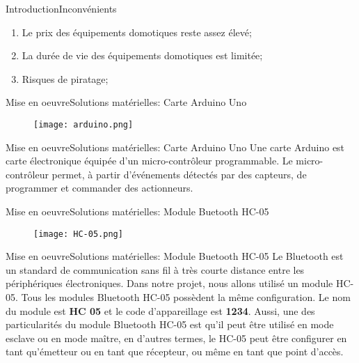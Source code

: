 \documentclass{beamer}
\begin{document}
	\begin{frame}{Introduction}{Inconvénients}
		\begin{enumerate}
			\item Le prix des équipements domotiques reste assez élevé;
			\item La durée de vie des équipements domotiques est limitée;
			\item Risques de piratage;
		\end{enumerate}
		
	\end{frame}
	
	\begin{frame}{Mise en oeuvre}{Solutions matérielles: Carte Arduino Uno}
		\begin{figure}\centering
			\texttt{[image: arduino.png]}
		\end{figure}	
	\end{frame}
	
	\begin{frame}{Mise en oeuvre}{Solutions matérielles: Carte Arduino Uno}
		Une carte Arduino est carte électronique équipée d'un micro-contrôleur programmable. Le micro-contrôleur permet, à partir d'événements détectés par des capteurs, de programmer et commander des actionneurs.	
	\end{frame}
	
	\begin{frame}{Mise en oeuvre}{Solutions matérielles: Module Buetooth HC-05}
		\begin{figure}\centering
			\texttt{[image: HC-05.png]}
		\end{figure}
		
	\end{frame}
	
	\begin{frame}{Mise en oeuvre}{Solutions matérielles: Module Buetooth HC-05}
		Le Bluetooth est un standard de communication sans fil à très courte distance entre les périphériques électroniques. Dans notre projet, nous allons utilisé un module HC-05. Tous les modules Bluetooth HC-05 possèdent la même configuration. Le nom du module est \textbf{HC 05} et le code d'appareillage est \textbf{1234}. Aussi, une des particularités du module Bluetooth HC-05 est qu'il peut être utilisé en mode esclave ou en mode maître, en d'autres termes, le HC-05  peut être configurer en tant qu'émetteur ou en tant que récepteur, ou même en tant
		que point d'accès.
	\end{frame}
	
\end{document}
